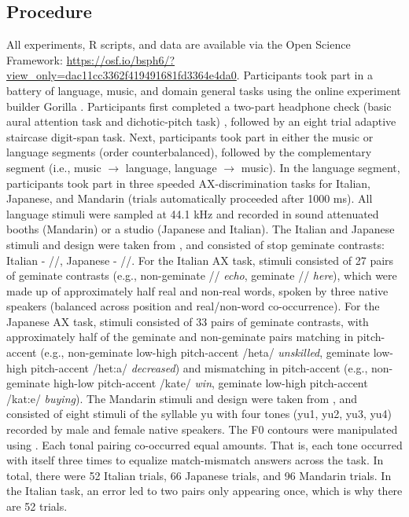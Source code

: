 \documentclass[a4paper]{article}
\begin{document}
\subsection{Procedure}
All experiments, R scripts, and data are available via the Open Science Framework: \url{https://osf.io/bsph6/?view_only=dac11cc3362f419491681fd3364e4da0}. Participants took part in a battery of language, music, and domain general tasks using the online experiment builder Gorilla \cite{gorilla_Anwyl-Irvine_2019}. Participants first completed a two-part headphone check (basic aural attention task and dichotic-pitch task) \cite{milne_2021}, followed by an eight trial adaptive staircase digit-span task. Next, participants took part in either the music or language segments (order counterbalanced), followed by the complementary segment (i.e., music $\rightarrow$ language, language $\rightarrow$ music). In the language segment, participants took part in three speeded AX-discrimination tasks for Italian, Japanese, and Mandarin (trials automatically proceeded after 1000 ms). All language stimuli were sampled at 44.1 kHz and recorded in sound attenuated booths (Mandarin) or a studio (Japanese and Italian). The Italian and Japanese stimuli and design were taken from \cite{Tsukada_Cox_Hajek_Hirata_2017}, and consisted of stop geminate contrasts: Italian - //, Japanese - //. For the Italian AX task, stimuli consisted of 27 pairs of geminate contrasts (e.g., non-geminate // \textit{echo}, geminate // \textit{here}), which were made up of approximately half real and non-real words, spoken by three native speakers (balanced across position and real/non-word co-occurrence). For the Japanese AX task, stimuli consisted of 33 pairs of geminate contrasts, with approximately half of the geminate and non-geminate pairs matching in pitch-accent (e.g., non-geminate low-high pitch-accent /heta/ \textit{unskilled}, geminate low-high pitch-accent /het:a/ \textit{decreased}) and mismatching in pitch-accent (e.g., non-geminate high-low pitch-accent /kate/ \textit{win}, geminate low-high pitch-accent /kat:e/ \textit{buying}). The Mandarin stimuli and design were taken from \cite{Wiener_Bradley_2020}, and consisted of eight stimuli of the syllable yu with four tones (yu1, yu2, yu3, yu4) recorded by male and female native speakers. The F0 contours were manipulated using \cite{Boersma_Weenink}. Each tonal pairing co-occurred equal amounts. That is, each tone occurred with itself three times to equalize match-mismatch answers across the task. In total, there were 52 Italian trials, 66 Japanese trials, and 96 Mandarin trials. In the Italian task, an error led to two pairs only appearing once, which is why there are 52 trials.
\end{document}
